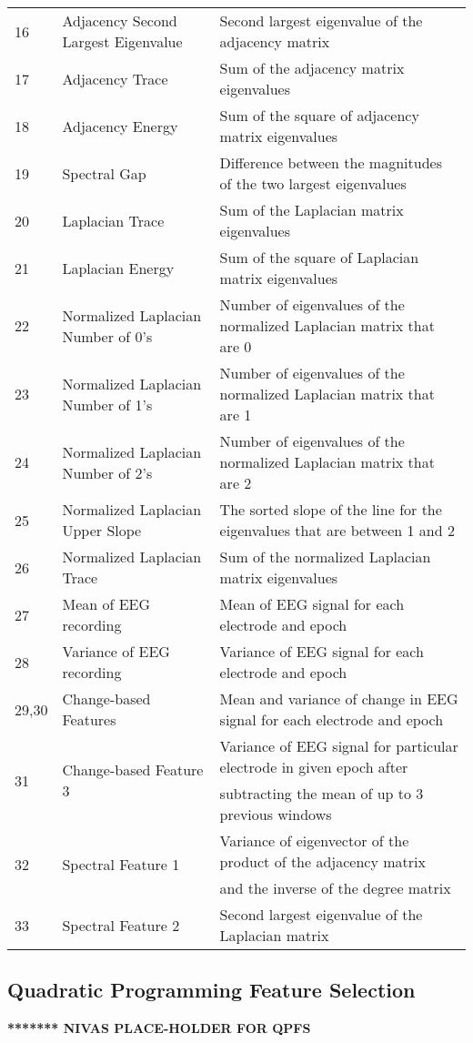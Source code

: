 \documentclass{article} %
\begin{document}
\begin{table}[htb]
\begin{tabular}{lll}
16&Adjacency Second Largest Eigenvalue&Second largest eigenvalue of the adjacency matrix\\
17&Adjacency Trace & Sum of the adjacency matrix eigenvalues\\
18&Adjacency Energy & Sum of the square of adjacency matrix eigenvalues\\
19&Spectral Gap &  Difference between the magnitudes of the two largest eigenvalues\\
20 &Laplacian Trace & Sum of the Laplacian matrix eigenvalues\\
21&Laplacian Energy &  Sum of the square of Laplacian matrix eigenvalues\\
22&Normalized Laplacian Number of 0's & Number of eigenvalues of the normalized Laplacian matrix that are 0\\
23&Normalized Laplacian Number of 1's&  Number of eigenvalues of the normalized Laplacian matrix that are 1\\
24&Normalized Laplacian Number of 2's& Number of eigenvalues of the normalized Laplacian matrix that are 2\\ 
25&Normalized Laplacian Upper Slope& The sorted slope of the line for the eigenvalues that are between 1 and 2\\
26&Normalized Laplacian Trace& Sum of the normalized Laplacian matrix eigenvalues\\
27&Mean of EEG recording&Mean of EEG signal for each electrode and epoch\\
28&Variance of EEG recording&Variance of EEG signal for each electrode and epoch\\
29,30&Change-based Features&Mean and variance of change in EEG signal for each electrode and epoch\\
\multirow{2}{*}{31}&\multirow{2}{*}{Change-based Feature 3}&Variance of EEG signal for particular electrode in given epoch after\\
&&subtracting the mean of up to 3 previous windows \\
\multirow{2}{*}{32}&\multirow{2}{*}{Spectral Feature 1}&Variance of eigenvector of the product of the adjacency matrix
\\&& and the inverse of the degree matrix\\
33&Spectral Feature 2&Second largest eigenvalue of the Laplacian matrix\\
\hline
\end{tabular}
\end{table}

\subsection{Quadratic Programming Feature Selection}
\textbf{******* NIVAS PLACE-HOLDER FOR QPFS}
\end{document}
